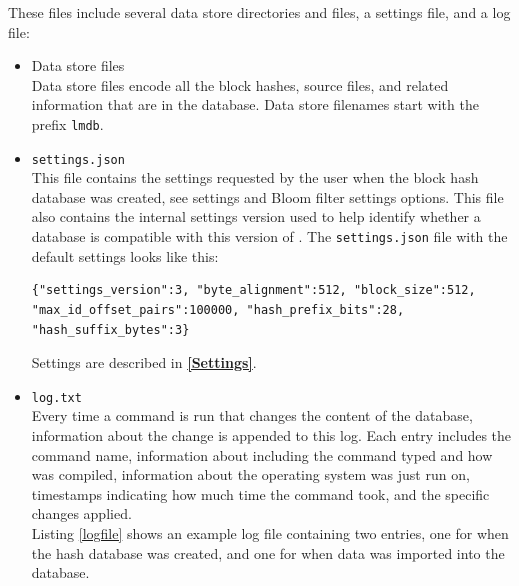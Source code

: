 \documentclass[11pt,fleqn]{article} %
\begin{document}
These files include several data store directories and files, a settings file, and a log file:

\begin{itemize}
\item Data store files \\
Data store files encode all the block hashes, source files, and related information that are in the database. Data store filenames start with the prefix \verb+lmdb+.

\item \texttt{settings.json} \\
This file contains the settings requested by the user when the block hash database was created, see \hdb settings and Bloom filter settings options.  This file also contains the internal \hdb settings version used to help \hdb identify whether a database is compatible with this version of \hdb. The \texttt{settings.json} file with the default settings looks like this:\\

\begingroup
\footnotesize
\begin{Verbatim}[fontfamily=courier]
{"settings_version":3, "byte_alignment":512, "block_size":512,
"max_id_offset_pairs":100000, "hash_prefix_bits":28,
"hash_suffix_bytes":3}
\end{Verbatim}
\endgroup

Settings are described in \textbf{\autoref{Settings}}.


\item \texttt{log.txt} \\
Every time a command is run that changes the content of the database, information about the change is appended to this log.  Each entry includes the command name, information about \hdb including the command typed and how \hdb was compiled, information about the operating system \hdb was just run on, timestamps indicating how much time the command took, and the specific \hdb changes applied.\\

Listing \ref{logfile} shows an example log file containing two entries, one for when the hash database was created, and one for when data was imported into the database.


\end{itemize}
\end{document}
